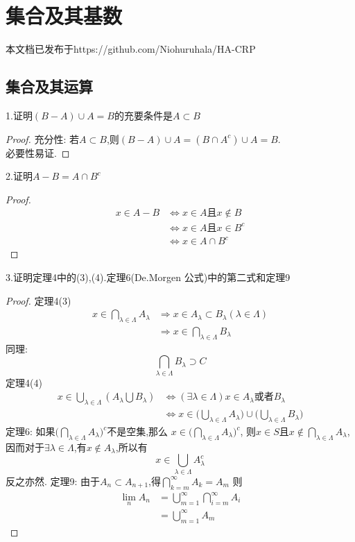 \chapter{集合及其基数}
本文档已发布于https://github.com/Niohuruhala/HA-CRP
\section{集合及其运算}
1.证明\((B-A) \cup A =B\)的充要条件是\(A \subset B\)
\begin{proof}
    充分性: 若\(A \subset B\),则\((B-A) \cup A = (B \cap A^{c})\cup A = B\). \\ 必要性易证.
\end{proof}
2.证明\(A -B = A \cap B^{c}\)
\begin{proof}
    \begin{align*}
        x \in A-B &\Leftrightarrow x \in A  \text{且} x \notin B \\ 
        &\Leftrightarrow x\in A \text{且} x \in B^{c} \\ 
        & \Leftrightarrow x \in A \cap B^{c}
    \end{align*}
\end{proof}
3.证明定理4中的(3),(4).定理6(De.Morgen 公式)中的第二式和定理9 
\begin{proof}
    定理4(3) \begin{align*}
        x \in \bigcap\limits_{\lambda \in \Lambda } A_{\lambda} & \Rightarrow x \in A_{\lambda} \subset B_{\lambda} (\lambda \in \Lambda) \\ 
        &\Rightarrow x \in \bigcap\limits_{\lambda \in \Lambda} B_{\lambda}
    \end{align*}
    同理: \[\bigcap\limits_{\lambda \in \Lambda} B_{\lambda} \supset C\]
    定理4(4) \begin{align*}
        x \in \bigcup\limits_{\lambda \in \Lambda} (A_{\lambda} \bigcup B_{\lambda}) &\Leftrightarrow (\exists \lambda \in \Lambda) x \in A_{\lambda} \text{或者} B_{\lambda} \\
            &\Leftrightarrow x \in \bigl(\bigcup\limits_{\lambda \in \Lambda}A_{\lambda}\bigr) \cup \bigl(\bigcup\limits_{\lambda \in \Lambda}B_{\lambda}\bigr)
    \end{align*}
    定理6: 如果\(\bigl(\bigcap\limits_{\lambda\in\Lambda}A_{\lambda}\bigr)^{c}\)不是空集,那么 \(x \in \bigl(\bigcap\limits_{\lambda\in\Lambda}A_{\lambda}\bigr)^{c}\),
    则\(x \in S \text{且} x \notin \bigcap\limits_{\lambda\in\Lambda}A_{\lambda}\),因而对于\(\exists \lambda \in \Lambda\),有\(x \notin A_{\lambda}\),所以有 \[x\in \bigcup\limits_{\lambda\in\Lambda} A^{c}_{\lambda}\]反之亦然.
    定理9: 由于\(A_n \subset A_{n+1}\),得\(\bigcap\limits_{k=m}^{\infty} A_k = A_m\)  则\begin{align*}
        \lim_{n} A_n &= \bigcup\limits_{m=1}^{\infty}\bigcap\limits_{i=m}^{\infty}A_i \\ 
        &= \bigcup\limits_{m=1}^{\infty}A_m 
    \end{align*}
\end{proof}
